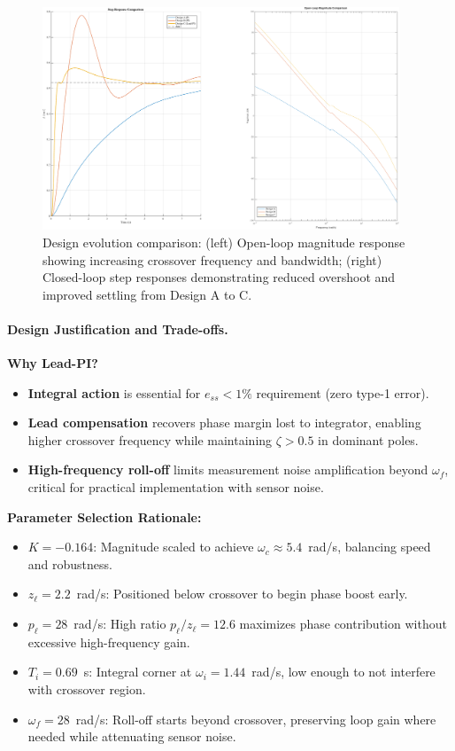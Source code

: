\begin{figure}[h!]
\centering
\includegraphics[width=0.95\textwidth]{../MATLAB/LaTeX_Exports/design_comparison.pdf}
\caption{Design evolution comparison: (left) Open-loop magnitude response showing increasing crossover frequency and bandwidth; (right) Closed-loop step responses demonstrating reduced overshoot and improved settling from Design A to C.}
\label{fig:design_comparison}
\end{figure}

\paragraph{Design Justification and Trade-offs.}

\textbf{Why Lead-PI?}
\begin{itemize}
\item \textbf{Integral action} is essential for $e_{ss} < 1\%$ requirement (zero type-1 error).
\item \textbf{Lead compensation} recovers phase margin lost to integrator, enabling higher crossover frequency while maintaining $\zeta > 0.5$ in dominant poles.
\item \textbf{High-frequency roll-off} limits measurement noise amplification beyond $\omega_f$, critical for practical implementation with sensor noise.
\end{itemize}

\textbf{Parameter Selection Rationale:}
\begin{itemize}
\item $K=-0.164$: Magnitude scaled to achieve $\omega_c \approx 5.4$~rad/s, balancing speed and robustness.
\item $z_\ell = 2.2$~rad/s: Positioned below crossover to begin phase boost early.
\item $p_\ell = 28$~rad/s: High ratio $p_\ell/z_\ell = 12.6$ maximizes phase contribution without excessive high-frequency gain.
\item $T_i = 0.69$~s: Integral corner at $\omega_i = 1.44$~rad/s, low enough to not interfere with crossover region.
\item $\omega_f = 28$~rad/s: Roll-off starts beyond crossover, preserving loop gain where needed while attenuating sensor noise.
\end{itemize}

